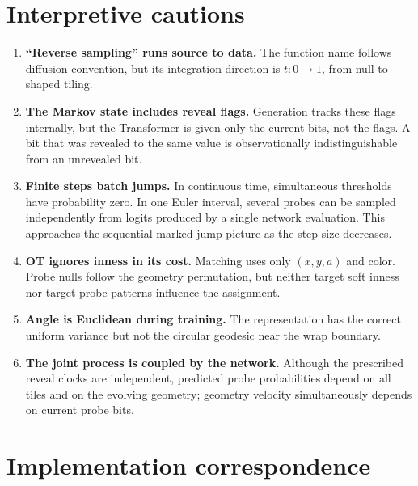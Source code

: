 \documentclass[11pt]{article}
\newcommand{\1}{\mathbf{1}}
\begin{document}
\section{Interpretive cautions}

\begin{enumerate}
  \item \textbf{``Reverse sampling'' runs source to data.}
        The function name follows diffusion convention, but its integration
        direction is \(t:0\to1\), from null to shaped tiling.

  \item \textbf{The Markov state includes reveal flags.}
        Generation tracks these flags internally, but the Transformer is given
        only the current bits, not the flags.  A bit that was revealed to the
        same value is observationally indistinguishable from an unrevealed bit.

  \item \textbf{Finite steps batch jumps.}
        In continuous time, simultaneous thresholds have probability zero.
        In one Euler interval, several probes can be sampled independently
        from logits produced by a single network evaluation.  This approaches
        the sequential marked-jump picture as the step size decreases.

  \item \textbf{OT ignores inness in its cost.}
        Matching uses only \((x,y,a)\) and color.  Probe nulls follow the
        geometry permutation, but neither target soft inness nor target probe
        patterns influence the assignment.

  \item \textbf{Angle is Euclidean during training.}
        The representation has the correct uniform variance but not the
        circular geodesic near the wrap boundary.

  \item \textbf{The joint process is coupled by the network.}
        Although the prescribed reveal clocks are independent, predicted probe
        probabilities depend on all tiles and on the evolving geometry;
        geometry velocity simultaneously depends on current probe bits.
\end{enumerate}

\section{Implementation correspondence}
\end{document}
